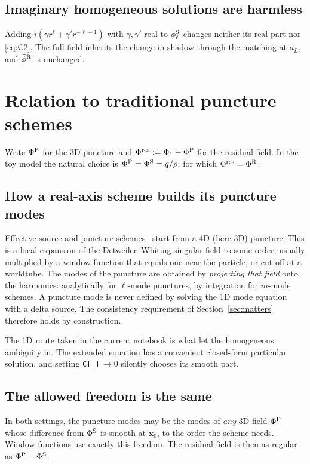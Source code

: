 \documentclass[11pt,a4paper]{article}
\newcommand{\PhiS}{\Phi^{\rm S}}
\newcommand{\PhiR}{\Phi^{\rm R}}
\newcommand{\phiS}{\phi^{\rm S}}
\newcommand{\x}{\mathbf{x}}
\newcommand{\code}[1]{\texttt{#1}}
\begin{document}
\subsection{Imaginary homogeneous solutions are harmless}
Adding $i(\gamma r^\ell+\gamma' r^{-\ell-1})$ with $\gamma,\gamma'$ real to $\phiS_\ell$ changes neither its real part nor \eqref{eq:C2}.
The full field inherits the change in shadow through the matching at $a_L$, and $\tilde\phi^{\rm R}$ is unchanged.

\section{Relation to traditional puncture schemes}\label{sec:traditional}

Write $\Phi^{\rm P}$ for the 3D puncture and $\Phi^{\rm res}:=\Phi_1-\Phi^{\rm P}$ for the residual field.
In the toy model the natural choice is $\Phi^{\rm P}=\PhiS=q/\rho$, for which $\Phi^{\rm res}=\PhiR$.

\subsection{How a real-axis scheme builds its puncture modes}
Effective-source and puncture schemes~\cite{BarackGolbourn2007,VegaDetweiler2008} start from a 4D (here 3D) puncture.
This is a local expansion of the Detweiler--Whiting singular field to some order, usually multiplied by a window function that equals one near the particle, or cut off at a worldtube.
The modes of the puncture are obtained by \emph{projecting that field} onto the harmonics: analytically for $\ell$-mode punctures, by integration for $m$-mode schemes.
A puncture mode is never defined by solving the 1D mode equation with a delta source.
The consistency requirement of Section~\ref{sec:matters} therefore holds by construction.

The 1D route taken in the current notebook is what let the homogeneous ambiguity in.
The extended equation has a convenient closed-form particular solution, and setting \code{C[\_]}\,$\to0$ silently chooses its smooth part.

\subsection{The allowed freedom is the same}
In both settings, the puncture modes may be the modes of \emph{any} 3D field $\Phi^{\rm P}$ whose difference from $\PhiS$ is smooth at $\x_0$, to the order the scheme needs.
Window functions use exactly this freedom.
The residual field is then as regular as $\Phi^{\rm P}-\PhiS$.
\end{document}

